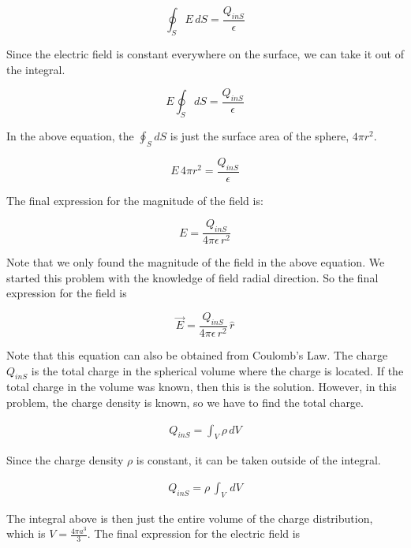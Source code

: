 \documentclass{ximera}
\begin{document}
\begin{equation}
\oint_S E \,dS  = \frac{Q_{inS}}{\epsilon}
\end{equation}

Since the electric field is constant everywhere on the surface, we can take it out of the integral. 


\begin{equation}
 E \oint_S dS = \frac{Q_{inS}}{\epsilon}
\end{equation}

In the above equation, the $\oint_S dS $ is just the surface area of the sphere, $4 \pi r^2$.


\begin{equation}
 E \, 4 \pi r^2 = \frac{Q_{inS}}{\epsilon}
\end{equation}

The final expression for the magnitude of the field is:


\begin{equation}
 E  = \frac{Q_{inS}}{4 \pi  \epsilon \, r^2}
\end{equation}

Note that we only found the magnitude of the field in the above equation. We started this problem with the knowledge of field radial direction. So the final expression for the field is

\begin{equation}
 \vec{E}  = \frac{Q_{inS}}{4 \pi  \epsilon \, r^2} \, \hat{r}
\end{equation}

Note that this equation can also be obtained from Coulomb's Law. The charge $Q_{inS}$ is the total charge in the spherical volume where the charge is located. If the total charge in the volume was known, then this is the solution. However, in this problem, the charge density is known, so we have to find the total charge.

\begin{eqnarray}
Q_{inS}=\int_V \rho \, dV
\end{eqnarray}

Since the charge density $\rho$ is constant, it can be taken outside of the integral.


\begin{eqnarray}
Q_{inS}=\rho \, \int_V \, dV
\end{eqnarray}

The integral above is then just the entire volume of the charge distribution, which is $V=\frac{4 \pi a^3}{3}$. The final expression for the electric field is 
\end{document}
